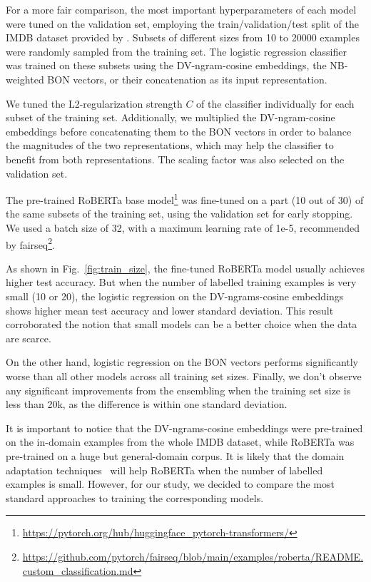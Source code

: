 \documentclass[11pt]{article}
\begin{document}
For a more fair comparison, the most important hyperparameters of each model were tuned on the validation set, employing the train/validation/test split of the IMDB dataset provided by \citep{suchin2020}. Subsets of different sizes from 10 to 20000 examples were randomly sampled from the training set. The logistic regression classifier was trained on these subsets using the DV-ngram-cosine embeddings, the NB-weighted BON vectors, or their concatenation as its input representation. 

We tuned the L2-regularization strength $C$ of the classifier individually for each subset of the training set. Additionally, we multiplied the DV-ngram-cosine embeddings before concatenating them to the BON vectors in order to balance the magnitudes of the two representations, which may help the classifier to benefit from both representations. The scaling factor was also selected on the validation set. 

The pre-trained RoBERTa base model\footnote{\url{https://pytorch.org/hub/huggingface_pytorch-transformers/}} was fine-tuned on a part (10 out of 30) of the same subsets of the training set, using the validation set for early stopping. We used a batch size of 32, with a maximum learning rate of 1e-5, recommended by fairseq\footnote{\url{https://github.com/pytorch/fairseq/blob/main/examples/roberta/README.custom_classification.md}}. 


As shown in Fig.~\ref{fig:train_size}, the fine-tuned RoBERTa model usually achieves higher test accuracy. But when the number of labelled training examples is very small (10 or 20), the logistic regression on the DV-ngrams-cosine embeddings shows higher mean test accuracy and lower standard deviation. This result corroborated the notion that small models can be a better choice when the data are scarce.

On the other hand, logistic regression on the BON vectors performs significantly worse than all other models across all training set sizes. Finally, we don't observe any significant improvements from the ensembling when the training set size is less than 20k, as the difference is within one standard deviation.

It is important to notice that the DV-ngrams-cosine embeddings were pre-trained on the in-domain examples from the whole IMDB dataset, while RoBERTa was pre-trained on a huge but general-domain corpus.
It is likely that the domain adaptation techniques~\cite{suchin2020} will help RoBERTa when the number of labelled examples is small. However, for our study, we decided to compare the most standard approaches to training the corresponding models.
\end{document}

